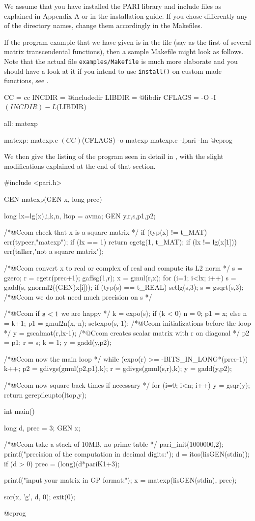 
We assume that you have installed the PARI library and include files as
explained in Appendix A or in the installation guide. If you chose
differently any of the directory names, change them accordingly in the
Makefiles.

If the program example that we have given is in the file  (say
as the first of several matrix transcendental functions), then a sample
Makefile might look as follows. Note that the actual file
{\tt examples/Makefile} is much more elaborate and you should have a look at
it if you intend to use {\tt install()} on custom made functions, see
.

\bprog
CC = cc
INCDIR = @includedir
LIBDIR = @libdir
CFLAGS = -O -I$(INCDIR) -L$(LIBDIR)

all:  matexp

matexp:  matexp.c
      $(CC) $(CFLAGS) -o matexp matexp.c -lpari -lm
@eprog

\noindent We then give the listing of the program 
seen in detail in , with the slight modifications explained
at the end of that section.

\bprog
#include <pari.h>

GEN
matexp(GEN x, long prec)
{
   long lx=lg(x),i,k,n, ltop = avma;
   GEN y,r,s,p1,p2;

  /*@Ccom check that x is a square matrix */
  if (typ(x) != t_MAT) err(typeer,"matexp");
  if (lx == 1) return cgetg(1, t_MAT);
  if (lx != lg(x[1])) err(talker,"not a square matrix");

  /*@Ccom convert x to real or complex of real and compute its L2 norm */
  s = gzero; r = cgetr(prec+1); gaffsg(1,r); x = gmul(r,x);
  for (i=1; i<lx; i++)
    s = gadd(s, gnorml2((GEN)x[i]));
  if (typ(s) == t_REAL) setlg(s,3);
  s = gsqrt(s,3); /*@Ccom we do not need much precision on s */

  /*@Ccom if ${\tt s}<1$ we are happy */
  k = expo(s);
  if (k < 0) { n = 0; p1 = x; }
  else { n = k+1; p1 = gmul2n(x,-n); setexpo(s,-1); }
  /*@Ccom initializations before the loop */
  y = gscalmat(r,lx-1); /*@Ccom creates scalar matrix with r on diagonal */
  p2 = p1; r = s; k = 1;
  y = gadd(y,p2);

  /*@Ccom now the main loop */
  while (expo(r) >= -BITS_IN_LONG*(prec-1))
  {
    k++; p2 = gdivgs(gmul(p2,p1),k);
    r = gdivgs(gmul(s,r),k); y = gadd(y,p2);
  }
  
  /*@Ccom now square back  times if necessary */
  for (i=0; i<n; i++) y = gsqr(y);
  return gerepileupto(ltop,y);
}



int
main()
{
  long d, prec = 3;
  GEN x;

  /*@Ccom take a stack of 10MB, no prime table */
  pari_init(1000000,2);
  printf("precision of the computation in decimal digits:\n");
  d = itos(lisGEN(stdin));
  if (d > 0) prec = (long)(d*pariK1+3);

  printf("input your matrix in GP format:\n");
  x = matexp(lisGEN(stdin), prec);

  sor(x, 'g', d, 0);
  exit(0);
}
@eprog\vfill\eject
